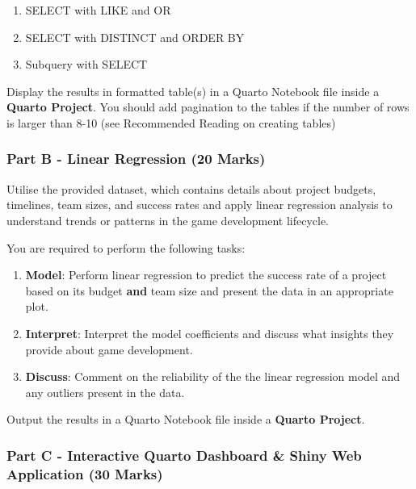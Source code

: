 \documentclass[
  letterpaper,
  DIV=11,
  numbers=noendperiod]{scrartcl}
\providecommand{\tightlist}{%
  \setlength{\itemsep}{0pt}\setlength{\parskip}{0pt}}\usepackage{longtable,booktabs,array}
\begin{document}
\begin{enumerate}
\def\labelenumi{\arabic{enumi}.}
\tightlist
\item
  SELECT with LIKE and OR
\item
  SELECT with DISTINCT and ORDER BY
\item
  Subquery with SELECT
\end{enumerate}

Display the results in formatted table(s) in a Quarto Notebook file
inside a \textbf{Quarto Project}. You should add pagination to the
tables if the number of rows is larger than 8-10 (see Recommended
Reading on creating tables)

\hypertarget{part-b---linear-regression-20-marks}{%
\subsubsection{Part B - Linear Regression (20
Marks)}\label{part-b---linear-regression-20-marks}}

Utilise the provided dataset, which contains details about project
budgets, timelines, team sizes, and success rates and apply linear
regression analysis to understand trends or patterns in the game
development lifecycle.

You are required to perform the following tasks:

\begin{enumerate}
\def\labelenumi{\arabic{enumi}.}
\tightlist
\item
  \textbf{Model}: Perform linear regression to predict the success rate
  of a project based on its budget \textbf{and} team size and present
  the data in an appropriate plot.
\item
  \textbf{Interpret}: Interpret the model coefficients and discuss what
  insights they provide about game development.
\item
  \textbf{Discuss}: Comment on the reliability of the the linear
  regression model and any outliers present in the data.
\end{enumerate}

Output the results in a Quarto Notebook file inside a \textbf{Quarto
Project}.

\hypertarget{part-c---interactive-quarto-dashboard-shiny-web-application-30-marks}{%
\subsubsection{Part C - Interactive Quarto Dashboard \& Shiny Web
Application (30
Marks)}\label{part-c---interactive-quarto-dashboard-shiny-web-application-30-marks}}
\end{document}
